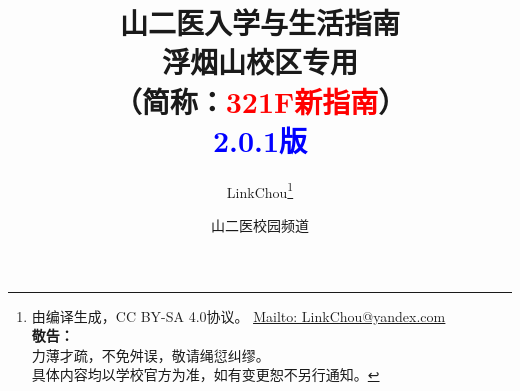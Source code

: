 

\title{%
\normalsize
{\Huge\textbf{山二医入学与生活指南}}\\[6pt]
{\large\textbf{浮烟山校区专用}}\\
（简称：\textcolor{red}{321F新指南}）\\[15pt]
{\large\textcolor{blue}{\textbf{2.0.1}版}}\vspace*{-25pt}}
\author{LinkChou\thanks{由\LaTeXe 编译生成，CC BY-SA 4.0协议。%
        \uline{\href{Mailto:LinkChou@yandex.com}{Mailto: LinkChou@yandex.com}}\\%
        \textbf{敬告：}\\%
        \indent\indent 力薄才疏，不免舛误，敬请绳愆纠缪。\\%
        \indent\indent 具体内容均以学校官方为准，如有变更恕不另行通知。}\and 山二医校园频道}
\date{\DTMnow}
\maketitle

\renewcommand{\thefootnote}{\arabic{footnote}}

\tableofcontents